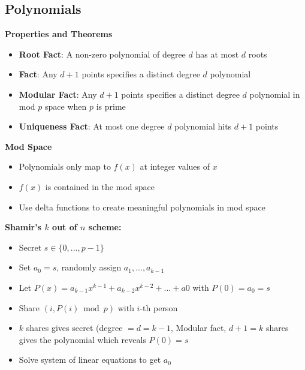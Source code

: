 \documentclass{article}\usepackage{amsmath,amssymb,amsthm,tikz,tkz-graph,color,chngpage,soul,hyperref,csquotes,graphicx,floatrow, listings,polynom}\newcommand*{\QEDB}{\hfill\ensuremath{\square}}\newtheorem*{prop}{Proposition}\renewcommand{\theenumi}{\alph{enumi}}\usepackage[shortlabels]{enumitem}\usepackage[nobreak=true]{mdframed}\usetikzlibrary{matrix,calc}\MakeOuterQuote{"}\usepackage[margin=0.75in]{geometry} \newtheorem{theorem}{Theorem}\newcommand{\Z}{\mathbb Z}\newcommand{\R}{\mathbb R}\newcommand{\Q}{\mathbb Q}\newcommand{\N}{\mathbb N}\newcommand{\x}[1]{\textrm{ #1 }}\newcommand{\pr}{\textrm{Pr}}
\begin{document}
\subsection*{Polynomials}
\begin{mdframed}
\textbf{Properties and Theorems}
\begin{itemize}
    \item \textbf{Root Fact}: A non-zero polynomial of degree $d$ has at most $d$ roots
    \item \textbf{Fact}: Any $d+1$ points specifies a distinct degree $d$ polynomial 
    \item \textbf{Modular Fact}: Any $d+1$ points specifies a distinct degree $d$ polynomial in mod $p$ space when $p$ is prime
    \item \textbf{Uniqueness Fact}: At most one degree $d$ polynomial hits $d+1$ points\\
\end{itemize}
\end{mdframed}
\textbf{Mod Space}
\begin{itemize}
    \item Polynomials only map to $f(x)$ at integer values of $x$
    \item $f(x)$ is contained in the mod space
    \item Use delta functions to create meaningful polynomials in mod space
\end{itemize}
\textbf{Shamir's $k$ out of $n$ scheme:}
\begin{itemize}
    \item Secret $s \in \{0, ..., p-1\}$
    \item Set $a_0 = s$, randomly assign $a_1, ..., a_{k-1}$
    \item Let $P(x) = a_{k-1}x^{k-1} + a_{k-2}x^{k-2} + ... + a0$ with $P(0) = a_0 = s$
    \item Share $(i, P(i) \bmod p)$ with $i$-th person
    \item $k$ shares gives secret (degree $= d = k-1$, Modular fact, $d+1 = k$ shares gives the polynomial which reveals $P(0) = s$
    \item Solve system of linear equations to get $a_0$
\end{itemize}

\pagebreak

\end{document}
